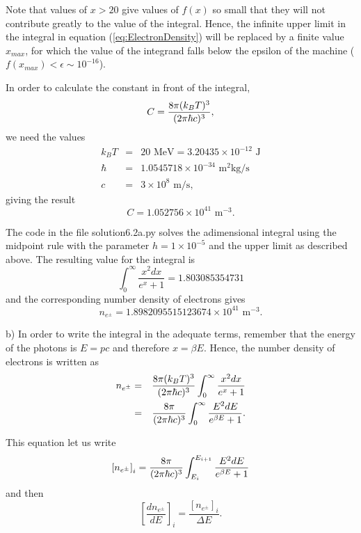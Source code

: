 \documentclass[11pt]{article}
\begin{document}
Note that values of $x>20$ give values of  $f(x)$ so small that they will not contribute greatly to the value of the integral. Hence, the infinite upper limit in the integral in equation (\ref{eq:ElectronDensity}) will be replaced by a finite value $x_{max}$, for which the value of the integrand falls below the epsilon of the machine ($ f(x_{max}) < \epsilon \sim 10^{-16}$).

In order to calculate the constant in front of the integral,
\begin{equation}
C = {8\pi (k_BT)^3 \over (2\pi\hbar
  c)^3} ,
\end{equation}
we need the values
\begin{eqnarray}
k_BT &=& 20 \text{ MeV} = 3.20435\times 10^{-12} \text{ J} \\
\hbar &=& 1.0545718 \times 10^{-34} \text{ m}^2 \text{kg/s}\\
c &=& 3 \times 10^8 \text{ m/s} ,
\end{eqnarray}
giving the result
\begin{equation}
C = 1.052756 \times 10^{41} \text{ m}^{-3}.
\end{equation}

The code in the file solution6.2a.py solves the adimensional integral using the midpoint rule with the parameter $h=1\times 10^{-5}$ and the upper limit as described above. The resulting value for the integral is
\begin{equation}
\int_0^\infty  \frac{x^2 dx}{e^{x} + 1} = 1.803085354731
\end{equation}
and the corresponding number density of electrons gives
\begin{equation}
n_{e^\pm} = 1.8982095515123674 \times 10^{41} \text{ m}^{-3}. \label{eq:electronDensity1}
\end{equation}

b) In order to write the integral in the adequate terms, remember  that the energy of the photons is $E = pc$ and therefore $x=\beta E$. Hence, the number density of electrons is written as
\begin{eqnarray}
n_{e^\pm}  &=&  {8\pi (k_BT)^3 \over (2\pi\hbar c)^3}\int_0^\infty  \frac{x^2 dx}{e^{x} + 1}\\
&=& {8\pi  \over (2\pi\hbar c)^3} \int_0^\infty  \frac{E^2 dE}{e^{\beta E} + 1}.
\end{eqnarray}

This equation let us write 
\begin{equation}
\left[ n_{e^\pm} \right]_i = {8\pi  \over (2\pi\hbar c)^3} \int_{E_i}^{E_{i+1}}  \frac{E^2 dE}{e^{\beta E} + 1}
\end{equation}
and then
\begin{equation}
\left[\frac{dn_{e^\pm}}{dE} \right]_i = \frac{[n_{e^\pm}]_i }{ \Delta E}.
\label{eq:spectrumEquation}
\end{equation}
\end{document}
